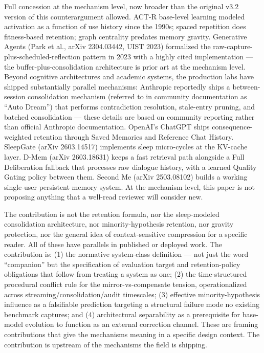 \documentclass[
  11pt,
]{article}
\begin{document}
Full concession at the mechanism level, now broader than the original
v3.2 version of this counterargument allowed. ACT-R base-level learning
modeled activation as a function of use history since the 1990s; spaced
repetition does fitness-based retention; graph centrality predates
memory gravity. Generative Agents (Park et al., arXiv 2304.03442, UIST
2023) formalized the raw-capture-plus-scheduled-reflection pattern in
2023 with a highly cited implementation --- the
buffer-plus-consolidation architecture is prior art at the mechanism
level. Beyond cognitive architectures and academic systems, the
production labs have shipped substantially parallel mechanisms:
Anthropic reportedly ships a between-session consolidation mechanism
(referred to in community documentation as ``Auto Dream'') that performs
contradiction resolution, stale-entry pruning, and batched consolidation
--- these details are based on community reporting rather than official
Anthropic documentation. OpenAI's ChatGPT ships consequence-weighted
retention through Saved Memories and Reference Chat History. SleepGate
(arXiv 2603.14517) implements sleep micro-cycles at the KV-cache layer.
D-Mem (arXiv 2603.18631) keeps a fast retrieval path alongside a Full
Deliberation fallback that processes raw dialogue history, with a
learned Quality Gating policy between them. Second Me (arXiv 2503.08102)
builds a working single-user persistent memory system. At the mechanism
level, this paper is not proposing anything that a well-read reviewer
will consider new.

The contribution is not the retention formula, nor the sleep-modeled
consolidation architecture, nor minority-hypothesis retention, nor
gravity protection, nor the general idea of context-sensitive
compression for a specific reader. All of these have parallels in
published or deployed work. The contribution is: (1) the normative
system-class definition --- not just the word ``companion'' but the
specification of evaluation target and retention-policy obligations that
follow from treating a system as one; (2) the time-structured procedural
conflict rule for the mirror-vs-compensate tension, operationalized
across streaming/consolidation/audit timescales; (3) effective
minority-hypothesis influence as a falsifiable prediction targeting a
structural failure mode no existing benchmark captures; and (4)
architectural separability as a prerequisite for base-model evolution to
function as an external correction channel. These are framing
contributions that give the mechanisms meaning in a specific design
context. The contribution is upstream of the mechanisms the field is
shipping.
\end{document}
